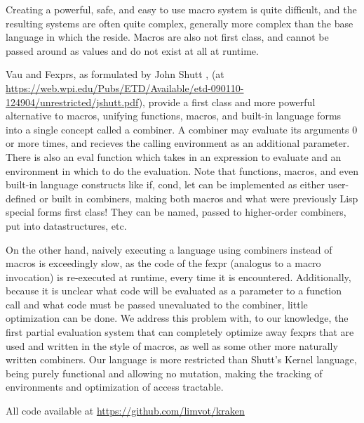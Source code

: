 \documentclass[acmsmall]{acmart}
\begin{document}
  Creating a powerful, safe, and easy to use macro system is quite difficult, and the resulting systems are often quite complex,
  generally more complex than the base language in which the reside. Macros are also not first class, and cannot be passed
  around as values and do not exist at all at runtime.

  Vau and Fexprs, as formulated by John Shutt \cite{shutt2010fexprs}, (at \url{https://web.wpi.edu/Pubs/ETD/Available/etd-090110-124904/unrestricted/jshutt.pdf}),
  provide a first class and more powerful alternative to macros, unifying functions, macros, and built-in language forms
  into a single concept called a combiner. A combiner may evaluate its arguments 0 or more times,
  and recieves the calling environment as an additional parameter. There is also an eval function which takes in an expression to evaluate
  and an environment in which to do the evaluation. Note that functions, macros, and even built-in language constructs like if, cond, let can be implemented
  as either user-defined or built in combiners, making both macros and what were previously Lisp special forms first class! They can be named,
  passed to higher-order combiners, put into datastructures, etc.

  On the other hand, naively executing a language using combiners instead of macros is exceedingly slow,
  as the code of the fexpr (analogus to a macro invocation) is re-executed at runtime, every time it is encountered.
  Additionally, because it is unclear what code will be evaluated as a parameter to a function call and what code
  must be passed unevaluated to the combiner, little optimization can be done. We address this problem with, to our knowledge,
  the first partial evaluation system that can completely optimize away fexprs that are used and written in the style of macros,
  as well as some other more naturally written combiners. Our language is more restricted than Shutt's Kernel language, being
  purely functional and allowing no mutation, making the tracking of environments and optimization of access tractable.

  All code available at \url{https://github.com/limvot/kraken}
\end{document}
